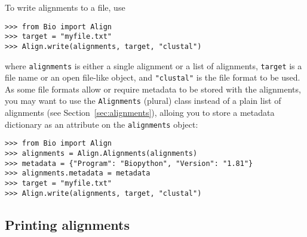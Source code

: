 To write alignments to a file, use
\begin{verbatim}
>>> from Bio import Align
>>> target = "myfile.txt"
>>> Align.write(alignments, target, "clustal")
\end{verbatim}
where \verb|alignments| is either a single alignment or a list of alignments, \verb|target| is a file name or an open file-like object, and \verb|"clustal"| is the file format to be used. As some file formats allow or require metadata to be stored with the alignments, you may want to use the \verb|Alignments| (plural) class instead of a plain list of alignments (see Section~\ref{sec:alignments}), alloing you to store a metadata dictionary as an attribute on the \verb|alignments| object:
\begin{verbatim}
>>> from Bio import Align
>>> alignments = Align.Alignments(alignments)
>>> metadata = {"Program": "Biopython", "Version": "1.81"}
>>> alignments.metadata = metadata
>>> target = "myfile.txt"
>>> Align.write(alignments, target, "clustal")
\end{verbatim}

\subsection{Printing alignments}
\label{subsec:align_printing}

